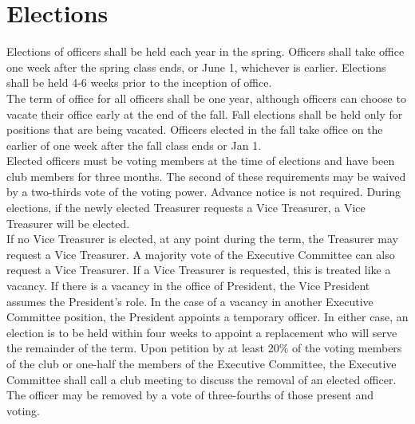 \documentclass{article}
\begin{document}
\section{Elections}
Elections of officers shall be held each year in the spring. Officers shall  take office one week after the spring class ends, or June 1, whichever is earlier. Elections shall be held 4-6 weeks prior to the inception of office.\\
The term of office for all officers shall be one year, although officers can choose to vacate their office early at the end of the fall. Fall elections shall be held only for positions that are being vacated.  Officers elected in the fall take office on the earlier of one week after the fall class ends or Jan 1. \\
Elected officers must be voting members at the time of elections and have been club members for three months. The second of these requirements may be waived by a two-thirds vote of the voting power. Advance notice is not required. 
During elections, if the newly elected Treasurer requests a Vice Treasurer, a Vice Treasurer will be elected. \\
If no Vice Treasurer is elected, at any point during the term, the Treasurer may request a Vice Treasurer. A majority vote of the Executive Committee can also request a Vice Treasurer. If a Vice Treasurer is requested, this is treated like a vacancy. 
If there is a vacancy in the office of President, the Vice President assumes the President's role. In the case of a vacancy in another Executive Committee position, the President appoints a temporary officer. In either case, an election is to be held within four weeks to appoint a replacement who will serve the remainder of the term. 
Upon petition by at least 20\% of the voting members of the club or one-half the members of the Executive Committee, the Executive Committee shall call a club meeting to discuss the removal of an elected officer.  The officer may be
removed by a vote of three-fourths of those present and voting.\\
\end{document}
